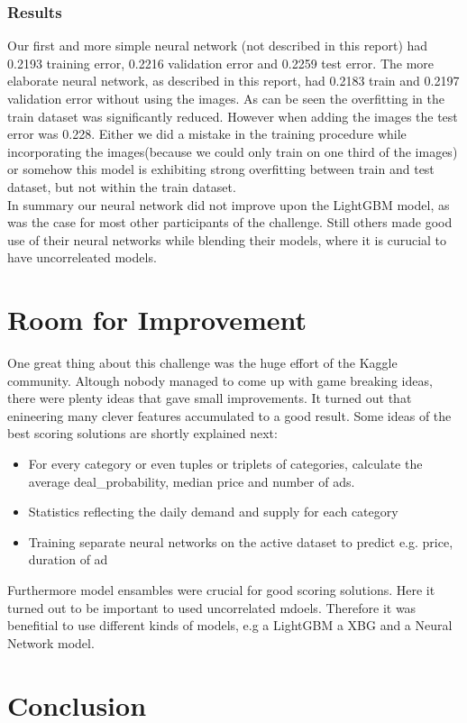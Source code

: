 \documentclass[runningheads]{llncs}
\begin{document}
 \subsubsection{Results}
 Our first and more simple neural network (not described in this report) had 0.2193 training error, 0.2216 validation error and 0.2259 test error. The more elaborate neural network, as described in this report, had 0.2183 train and 0.2197 validation error without using the images. As can be seen the overfitting in the train dataset was significantly reduced. However when adding the images the test error was 0.228. Either we did a mistake in the training procedure while incorporating the images(because we could only train on one third of the images) or somehow this model is exhibiting strong overfitting between train and test dataset, but not within the train dataset.\\
 In summary our neural network did not improve upon the LightGBM model, as was the case for most other participants of the challenge. Still others made good use of their neural networks while  blending their models, where it is curucial
  to have uncorreleated models.\\
 
 \section{Room for Improvement}
 One great thing about this challenge was the huge effort of the Kaggle community. Altough nobody managed to come up with game breaking ideas, there were plenty ideas that gave small improvements. It turned out that enineering many clever features accumulated to a good result. Some ideas of the best scoring solutions are shortly explained next:\\
 \begin{itemize}
 	\item For every category or even tuples or triplets of categories, calculate the average deal\_probability, median price and number of ads.
 	\item Statistics reflecting the daily demand and supply for each category
 	\item Training separate neural networks on the active dataset to predict e.g. price, duration of ad
 \end{itemize}

Furthermore model ensambles were crucial for good scoring solutions. Here it turned out to be important to used uncorrelated mdoels. Therefore it was benefitial to use different kinds of models, e.g a LightGBM a XBG and a Neural Network model. \\

 \section{Conclusion}
\end{document}

